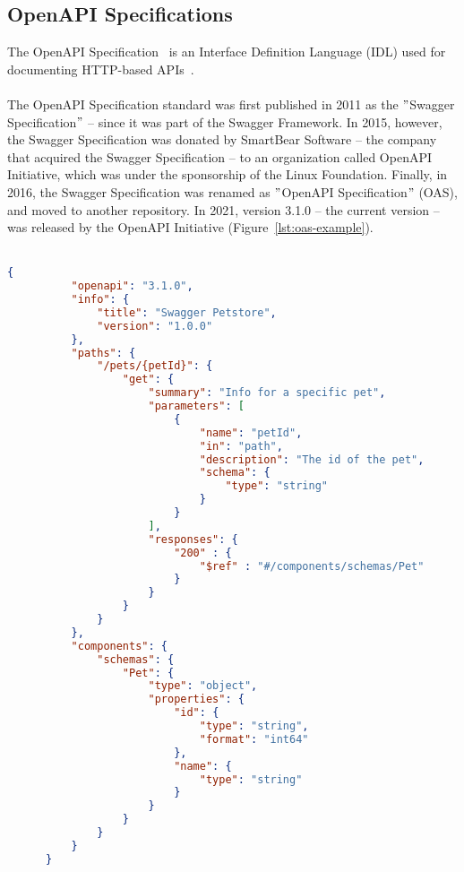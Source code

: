\subsection{OpenAPI Specifications}\label{subsec:openapi-specifications}
The OpenAPI Specification~\cite{noauthor_openapi_nodate} is an Interface Definition Language (IDL) used for documenting HTTP-based APIs~\cite{de_api_2017}. \\ \\
The OpenAPI Specification standard was first published in 2011 as the \("\)Swagger Specification\("\) -- since it was part of the Swagger Framework.
In 2015, however, the Swagger Specification was donated by SmartBear Software -- the company that acquired the Swagger Specification -- to an organization called OpenAPI Initiative, which was under the sponsorship of the Linux Foundation.
Finally, in 2016, the Swagger Specification was renamed as \("\)OpenAPI Specification\("\) (OAS), and moved to another repository.
In 2021, version 3.1.0 -- the current version -- was released by the OpenAPI Initiative (Figure~\ref{lst:oas-example}). \\ \\

\begin{lstlisting}[label={lst:oas-example},language=json,caption={Example of an OAS JSON document},captionpos=b,breaklines=true]
      {
          "openapi": "3.1.0",
          "info": {
              "title": "Swagger Petstore",
              "version": "1.0.0"
          },
          "paths": {
              "/pets/{petId}": {
                  "get": {
                      "summary": "Info for a specific pet",
                      "parameters": [
                          {
                              "name": "petId",
                              "in": "path",
                              "description": "The id of the pet",
                              "schema": {
                                  "type": "string"
                              }
                          }
                      ],
                      "responses": {
                          "200" : {
                              "$ref" : "#/components/schemas/Pet"
                          }
                      }
                  }
              }
          },
          "components": {
              "schemas": {
                  "Pet": {
                      "type": "object",
                      "properties": {
                          "id": {
                              "type": "string",
                              "format": "int64"
                          },
                          "name": {
                              "type": "string"
                          }
                      }
                  }
              }
          }
      }
\end{lstlisting}

